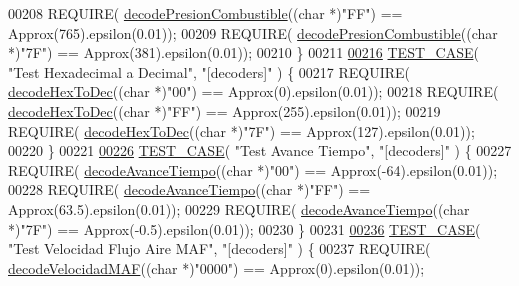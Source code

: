 \begin{DoxyCode}
{{{00208     REQUIRE( \hyperlink{decoders_8cpp_ab1c03e72734d4127a1c48f3b5a44a2e2}{decodePresionCombustible}((\textcolor{keywordtype}{char} *)\textcolor{stringliteral}{"FF"}) == Approx(765).epsilon(0.01));
00209     REQUIRE( \hyperlink{decoders_8cpp_ab1c03e72734d4127a1c48f3b5a44a2e2}{decodePresionCombustible}((\textcolor{keywordtype}{char} *)\textcolor{stringliteral}{"7F"}) == Approx(381).epsilon(0.01));
00210 \}
00211 
\hyperlink{UnitTestCase_8cpp_a282584e8fd720d07b04a2fd106c9a32c}{00216} \hyperlink{UnitTestCase_8cpp_ab1b7b485076e7de68cd9912827a8ee86}{TEST\_CASE}( \textcolor{stringliteral}{"Test Hexadecimal a Decimal"}, \textcolor{stringliteral}{"[decoders]"} ) \{
00217     REQUIRE( \hyperlink{decoders_8cpp_aa7c5243702d5462e4b638450e750624e}{decodeHexToDec}((\textcolor{keywordtype}{char} *)\textcolor{stringliteral}{"00"}) == Approx(0).epsilon(0.01));
00218     REQUIRE( \hyperlink{decoders_8cpp_aa7c5243702d5462e4b638450e750624e}{decodeHexToDec}((\textcolor{keywordtype}{char} *)\textcolor{stringliteral}{"FF"}) == Approx(255).epsilon(0.01));
00219     REQUIRE( \hyperlink{decoders_8cpp_aa7c5243702d5462e4b638450e750624e}{decodeHexToDec}((\textcolor{keywordtype}{char} *)\textcolor{stringliteral}{"7F"}) == Approx(127).epsilon(0.01));
00220 \}
00221 
\hyperlink{UnitTestCase_8cpp_a8c2e41bed6c672541f7b95ac1edecf0d}{00226} \hyperlink{UnitTestCase_8cpp_ab1b7b485076e7de68cd9912827a8ee86}{TEST\_CASE}( \textcolor{stringliteral}{"Test Avance Tiempo"}, \textcolor{stringliteral}{"[decoders]"} ) \{
00227     REQUIRE( \hyperlink{decoders_8cpp_a7a2fee87eace8ad6c86c628f5f91b3b5}{decodeAvanceTiempo}((\textcolor{keywordtype}{char} *)\textcolor{stringliteral}{"00"}) == Approx(-64).epsilon(0.01));
00228     REQUIRE( \hyperlink{decoders_8cpp_a7a2fee87eace8ad6c86c628f5f91b3b5}{decodeAvanceTiempo}((\textcolor{keywordtype}{char} *)\textcolor{stringliteral}{"FF"}) == Approx(63.5).epsilon(0.01));
00229     REQUIRE( \hyperlink{decoders_8cpp_a7a2fee87eace8ad6c86c628f5f91b3b5}{decodeAvanceTiempo}((\textcolor{keywordtype}{char} *)\textcolor{stringliteral}{"7F"}) == Approx(-0.5).epsilon(0.01));
00230 \}
00231 
\hyperlink{UnitTestCase_8cpp_af5a76ba4da5f3b2cafb3b5366118dbcd}{00236} \hyperlink{UnitTestCase_8cpp_ab1b7b485076e7de68cd9912827a8ee86}{TEST\_CASE}( \textcolor{stringliteral}{"Test Velocidad Flujo Aire MAF"}, \textcolor{stringliteral}{"[decoders]"} ) \{
00237     REQUIRE( \hyperlink{decoders_8cpp_adceefeb78a70b295b378f4c472630aa1}{decodeVelocidadMAF}((\textcolor{keywordtype}{char} *)\textcolor{stringliteral}{"0000"}) == Approx(0).epsilon(0.01));
}}}
\end{DoxyCode}
